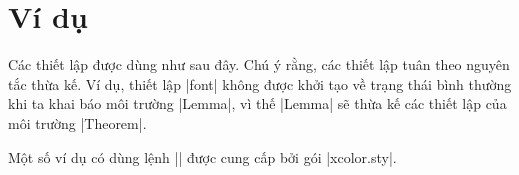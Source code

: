 \section{Ví dụ}

\label{sec:examples}

Các thiết lập được dùng như sau đây.
Chú ý rằng, các thiết lập tuân theo nguyên tắc thừa kế. Ví dụ,
thiết lập |font| không được khởi tạo về trạng thái bình thường khi ta
khai báo môi trường |Lemma|, vì thế |Lemma| sẽ thừa kế các thiết lập
của môi trường |Theorem|.

\medskip
Một số ví dụ có dùng lệnh |\color| được cung cấp bởi gói |xcolor.sty|.

